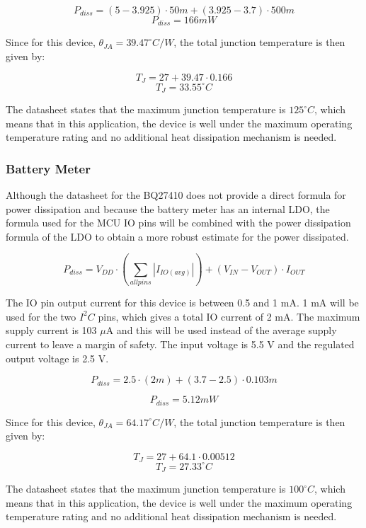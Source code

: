 \[P_{diss} = \left(5 - 3.925\right)\cdot 50m + \left(3.925 - 3.7\right)\cdot 500m\]
\[\boxed{P_{diss} = 166 mW}\]

Since for this device, $\theta_{JA} = 39.47^\circ C/W$, the total junction temperature is then given by:

\[T_J = 27 + 39.47 \cdot 0.166 \]
\[\boxed{T_J = 33.55 ^\circ C}\]

The datasheet states that the maximum junction temperature is $125^\circ C$, which means that in this application, the device is well under the maximum operating temperature rating and no additional heat dissipation mechanism is needed.


\subsubsection{Battery Meter}
Although the datasheet for the BQ27410 does not provide a direct formula for power dissipation and because the battery meter has an internal LDO, the formula used for the MCU IO pins will be combined with the power dissipation formula of the LDO to obtain a more robust estimate for the power dissipated.  

\[P_{diss} = V_{DD} \cdot \left(\sum_{allpins} |I_{IO(avg)}| \right) + \left(V_{IN} - V_{OUT}\right)\cdot I_{OUT}\]

The IO pin output current for this device is between 0.5 and 1 mA.  1 mA will be used for the two $I^2C$ pins, which gives a total IO current of 2 mA.  The maximum supply current is 103 $\mu$A and this will be used instead of the average supply current to leave a margin of safety.  The input voltage is 5.5 V and the regulated output voltage is 2.5 V.

\[P_{diss} = 2.5 \cdot \left(2m \right) + \left(3.7 - 2.5\right)\cdot 0.103m\]

\[\boxed{P_{diss} = 5.12 mW}\]

Since for this device, $\theta_{JA} = 64.17^\circ C/W$, the total junction temperature is then given by:

\[T_J = 27 + 64.1 \cdot 0.00512 \]
\[\boxed{T_J = 27.33 ^\circ C}\]

The datasheet states that the maximum junction temperature is $100^\circ C$, which means that in this application, the device is well under the maximum operating temperature rating and no additional heat dissipation mechanism is needed.

